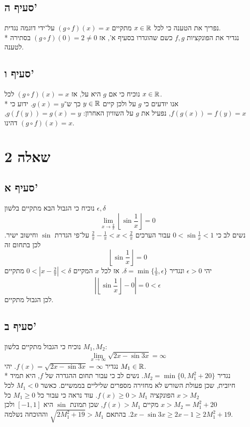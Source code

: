 \subsection{סעיף ה'}
נפריך את הטענה כי לכל $x \in \mathbb{R}$ מתקיים $(g \circ f)(x) = x$ על־ידי דוגמה נגדית. \\*
נגדיר את הפונקציות $f, g$ כשם שהוגדרו בסעיף א', אז $(g \circ f)(0) = 2 \ne 0$ בסתירה לטענה.

\subsection{סעיף ו'}
נוכיח כי אם $g$ היא על, אז $(g \circ f)(x) = x$ לכל $x \in \mathbb{R}$. \\*
אנו יודעים כי $g$ על ולכן קיים $y \in \mathbb{R}$ כך ש־$g(x) = y$.
ידוע כי $f(g(x)) = f(y) = x$, נפעיל את $g$ על השוויון האחרון: $g(f(y)) = g(x) = y$,
דהינו $(g \circ f)(x) = x$.

\section{שאלה 2}
\subsection{סעיף א'}
נוכיח כי הגבול הבא מתקיים בלשון $\epsilon, \delta$
\[
	\lim_{x \to \frac{2}{\pi}} \left\lfloor \sin \frac{1}{x} \right\rfloor = 0
\]
נשים לב כי $0 < \sin \frac{1}{x} < 1$ עבור הערכים $\frac{2}{\pi} - \frac{1}{\pi} < x < \frac{2}{\pi}$ על־פי הגדרת $\sin$ וחישוב ישיר.
לכן בתחום זה
\[
	\left\lfloor \sin \frac{1}{x} \right\rfloor = 0
\]
יהי $\epsilon > 0$ ונגדיר $\delta = \min\{ \frac{1}{\pi}, \epsilon \}$.
אז לכל $x$ המקיים $0 < | x - \frac{2}{\pi} | < \delta$ מתקיים
\[
	\left| \left\lfloor \sin \frac{1}{x} \right\rfloor - 0 \right| = 0 < \epsilon
\]
לכן הגבול מתקיים.

\subsection{סעיף ב'}
נוכיח כי הגבול מתקיים בלשון $M_1, M_2$:
\[
	\lim_{x \to \infty} \sqrt{2x - \sin 3x} = \infty
\]
נגדיר $f(x) = \sqrt{2x - \sin 3x} = \infty$. יהי $M_1 \in \mathbb{R}$. \\*
נגדיר $M_2 = \min\{ 0, M_1^2 + 20 \}$.
נשים לב כי עבור תחום ההגדרה של $f$, היא תמיד חיובית, שכן פעולת השורש לא מחזירה מספרים שליליים בממשיים.
כאשר $M_1 < 0$ לכל $x > M_2$ הפונקציה $f(x) \ge 0 > M_1$.
עוד נראה כי עבור כל $M_1 \ge 0$ כל $x > M_2 = M_1^2 + 20$ מקיים $f(x) > M_1$,
שכן תמונת $\sin$ היא $[-1, 1]$ ולכן $2x - \sin 3x \ge 2x - 1 \ge 2M_1^2 + 19$.
בהתאם $\sqrt{2M_1^2 + 19} > M_1$ וההוכחה נשלמה.

